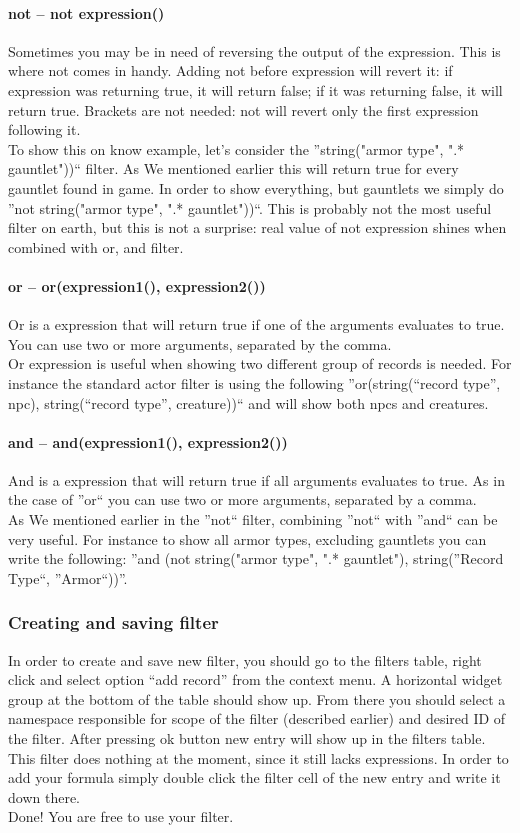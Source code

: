 \paragraph{not -- not expression()}
Sometimes you may be in need of reversing the output of the expression. This is where not comes in handy. Adding not before expression will revert it: if expression was returning true, it will return false; if it was returning false, it will return true. Brackets are not needed: not will revert only the first expression following it.\\
To show this on know example, let's consider the ''string("armor type", ".* gauntlet"))`` filter. As We mentioned earlier this will return true for every gauntlet found in game. In order to show everything, but gauntlets we simply do ''not string("armor type", ".* gauntlet"))``. This is probably not the most useful filter on earth, but this is not a surprise: real value of not expression shines when combined with or, and filter.

\paragraph{or -- or(expression1(), expression2())}
Or is a expression that will return true if one of the arguments evaluates to true. You can use two or more arguments, separated by the comma.\\
Or expression is useful when showing two different group of records is needed. For instance the standard actor filter is using the following ''or(string(``record type'', npc), string(``record type'', creature))`` and will show both npcs and creatures.

\paragraph{and -- and(expression1(), expression2())}
And is a expression that will return true if all arguments evaluates to true. As in the case of ''or`` you can use two or more arguments, separated by a comma.\\
As We mentioned earlier in the ''not`` filter, combining ''not`` with ''and`` can be very useful. For instance to show all armor types, excluding gauntlets you can write the following: ''and (not string("armor type", ".* gauntlet"), string(''Record Type``, ''Armor``))''.

\subsubsection{Creating and saving filter}
In order to create and save new filter, you should go to the filters table, right click and select option ``add record'' from the context menu. A horizontal widget group at the bottom of the table should show up. From there you should select a namespace responsible for scope of the filter (described earlier) and desired ID of the filter. After pressing ok button new entry will show up in the filters table. This filter does nothing at the moment, since it still lacks expressions. In order to add your formula simply double click the filter cell of the new entry and write it down there.\\
Done! You are free to use your filter.

